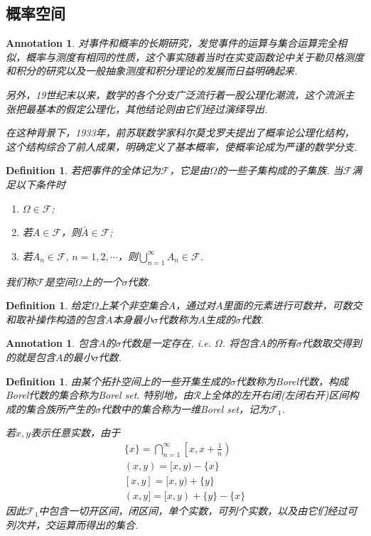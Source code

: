 \documentclass{article}
\newtheorem{definition}[theorem]{Definition}
\newtheorem{annotation}[theorem]{Annotation}
\begin{document}
\newpage
\subsection{概率空间}

\begin{annotation}
\rm 对事件和概率的长期研究，发觉事件的运算与集合运算完全相似，概率与测度有相同的性质，这个事实随着当时在实变函数论中关于勒贝格测度和积分的研究以及一般抽象测度和积分理论的发展而日益明确起来. 

另外，19世纪末以来，数学的各个分支广泛流行着一股公理化潮流，这个流派主张把最基本的假定公理化，其他结论则由它们经过演绎导出.

在这种背景下，1933年，前苏联数学家科尔莫戈罗夫提出了概率论公理化结构，这个结构综合了前人成果，明确定义了基本概率，使概率论成为严谨的数学分支.
\end{annotation}

\begin{definition}
\rm 若把事件的全体记为$\mathscr{F}$，它是由$\Omega$的一些子集构成的子集族. 当$\mathscr{F}$满足以下条件时
\begin{enumerate}
	\item $\Omega \in \mathscr{F}$;
	\item 若$A \in \mathscr{F}$，则$\bar{A} \in \mathscr{F}$;
	\item 若$A_n \in \mathscr{F}, \, n=1,2,\cdots$，则$\bigcup\limits_{n=1}^{\infty} A_n \in \mathscr{F}$.
\end{enumerate}
我们称$\mathscr{F}$是空间$\Omega$上的一个{\color{red}$\sigma$代数}. 
\end{definition}

\begin{definition}
\rm 给定$\Omega$上某个非空集合$A$，通过对$A$里面的元素进行可数并，可数交和取补操作构造的包含$A$本身最小$\sigma$代数称为$A${\color{red}生成}的$\sigma$代数.
\end{definition}

\begin{annotation}
\rm 包含$A$的$\sigma$代数是一定存在, i.e. $\Omega$. 将包含$A$的所有$\sigma$代数取交得到的就是包含$A$的最小$\sigma$代数. 
\end{annotation}

\begin{definition}
\rm 由某个拓扑空间上的一些开集生成的$\sigma$代数称为Borel代数，构成Borel代数的集合称为{\color{red}Borel set}. 特别地，由$\mathcal{R}$上全体的左开右闭(左闭右开)区间构成的集合族所产生的$\sigma$代数中的集合称为一维Borel set，记为$\mathscr{F}_1$. 

若$x,y$表示任意实数，由于
$$
\begin{array}{ll}
\{x\} =\bigcap\limits_{n=1}^{\infty}\left[x,x+\frac{1}{n}\right) \\
(x,y) = [x,y) - \{x\} \\
\left[x,y\right] = [x,y) + \{y\} \\
(x,y] = [x,y) + \{y\} - \{x\}
\end{array}
$$
因此$\mathscr{F}_1$中包含一切开区间，闭区间，单个实数，可列个实数，以及由它们经过可列次并，交运算而得出的集合. 
\end{definition}
\end{document}
